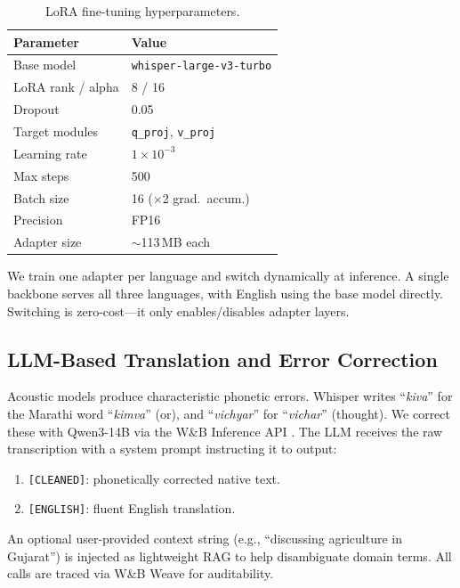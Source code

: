 \documentclass[11pt]{article}
\begin{document}
\begin{table}[t]
\centering\small
\caption{LoRA fine-tuning hyperparameters.}
\label{tab:lora}
\begin{tabular}{ll}
\toprule
\textbf{Parameter} & \textbf{Value} \\
\midrule
Base model & \texttt{whisper-large-v3-turbo} \\
LoRA rank / alpha & 8 / 16 \\
Dropout & 0.05 \\
Target modules & \texttt{q\_proj}, \texttt{v\_proj} \\
Learning rate & $1 \times 10^{-3}$ \\
Max steps & 500 \\
Batch size & 16 ($\times$2 grad.\ accum.) \\
Precision & FP16 \\
Adapter size & $\sim$113\,MB each \\
\bottomrule
\end{tabular}
\end{table}

We train one adapter per language and switch dynamically at inference.  A single backbone serves all three languages, with English using the base model directly.  Switching is zero-cost---it only enables/disables adapter layers.

\subsection{LLM-Based Translation and Error Correction}\label{sec:llm}

Acoustic models produce characteristic phonetic errors.  Whisper writes ``\textit{kiva}'' for the Marathi word ``\textit{kimva}'' (or), and ``\textit{vichyar}'' for ``\textit{vichar}'' (thought).  We correct these with Qwen3-14B \citep{qwen3_2025} via the W\&B Inference API \citep{wandb2024}.  The LLM receives the raw transcription with a system prompt instructing it to output:
\begin{enumerate}\itemsep0pt
    \item \texttt{[CLEANED]}: phonetically corrected native text.
    \item \texttt{[ENGLISH]}: fluent English translation.
\end{enumerate}

An optional user-provided context string (e.g., ``discussing agriculture in Gujarat'') is injected as lightweight RAG to help disambiguate domain terms.  All calls are traced via W\&B Weave for auditability.
\end{document}
